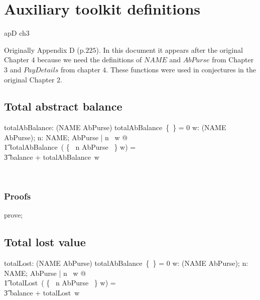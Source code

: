 \chapter{Auxiliary toolkit definitions}\label{apD}

\begin{zsection}
  \SECTION apD \parents ch3
\end{zsection}

Originally Appendix D (p.$225$). In this document it appears after the original
Chapter $4$ because we need the definitions of $NAME$ and $AbPurse$ from
Chapter $3$ and $PayDetails$ from chapter $4$. These functions were used in
conjectures in the original Chapter $2$.

\section{Total abstract balance}

\begin{LADef}
\begin{axdef}
   totalAbBalance: (NAME \ffun AbPurse) \fun \nat
\where
      totalAbBalance~\{~\} = 0
   \also
      \forall w: (NAME \ffun AbPurse); n: NAME; AbPurse | n \notin \dom~w @ \\
          \t1 totalAbBalance~( \{~ n \mapsto \theta AbPurse ~\} \cup w) = \\
                \t3 balance + totalAbBalance~w
\end{axdef}~\end{LADef}

\subsection*{Proofs}

\begin{LDCheck}\begin{zproof}
   prove;
\end{zproof}\end{LDCheck}

\section{Total lost value}

\begin{LADef}
\begin{axdef}
   totalLost: (NAME \ffun AbPurse) \fun \nat
\where
      totalAbBalance~\{~\} = 0
   \also
      \forall w: (NAME \ffun AbPurse); n: NAME; AbPurse | n \notin \dom~w @ \\
          \t1 totalLost~( \{~ n \mapsto \theta AbPurse ~\} \cup w) = \\
                \t3 balance + totalLost~w
\end{axdef}~\end{LADef}

